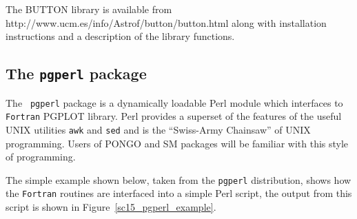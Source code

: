 \documentclass[twoside,11pt]{article}
\newcommand{\htmladdnormallink}[2]{#1}
\newcommand{\htmlref}[2]{#1}
\newcommand{\xlabel}[1]{}
\begin{document}
The BUTTON library is available from \htmladdnormallink{
http://www.ucm.es/info/Astrof/button/button.html}{
http://www.ucm.es/info/Astrof/button/button.html} along with
installation instructions and a description of the library functions.

\subsection{\xlabel{sc15_pgperl}The {\tt pgperl} package\label{sc15_pgperl}}

The \htmladdnormallink{{\tt
pgperl}}{http://www.aao.gov.au/local/www/kgb/pgperl/} package is a
dynamically loadable \htmladdnormallink{Perl}{http://www.perl.com/}
module which interfaces to {\tt Fortran} PGPLOT library. Perl provides
a superset of the features of the useful UNIX utilities \texttt{awk}
and \texttt{sed} and is the ``Swiss-Army Chainsaw'' of UNIX
programming. Users of \htmlref{PONGO}{sc15_pongo} and
\htmlref{SM}{sc15_sm} packages will be familiar with this style of
programming.

The simple example shown below, taken from the {\tt pgperl}
distribution, shows how the {\tt Fortran} routines are interfaced into
a simple Perl script, the output from this script is shown in
Figure~\ref{sc15_pgperl_example}.
\end{document}
